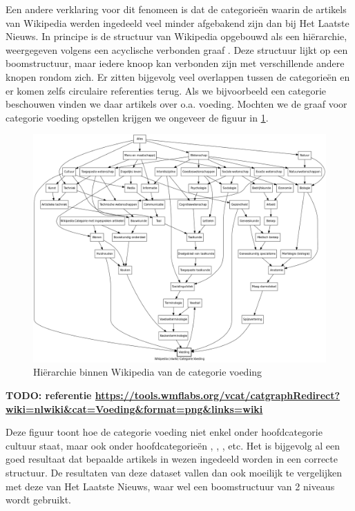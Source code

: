 Een andere verklaring voor dit fenomeen is dat de categorie\"en waarin de artikels van Wikipedia werden ingedeeld veel minder afgebakend zijn dan bij Het Laatste Nieuws. In principe is de structuur van Wikipedia opgebouwd als een hi\"erarchie, weergegeven volgens een acyclische verbonden graaf \cite{Milne2007}. Deze structuur lijkt op een boomstructuur, maar iedere knoop kan verbonden zijn met verschillende andere knopen rondom zich. Er zitten bijgevolg veel overlappen tussen de categorie\"en en er komen zelfs circulaire referenties terug. Als we bijvoorbeeld een categorie  beschouwen vinden we daar artikels over o.a. voeding. Mochten we de graaf voor categorie voeding opstellen krijgen we ongeveer de figuur in \ref{fig:wiki-voeding}.

\begin{figure}[h]
	\caption{Hi\"erarchie binnen Wikipedia van de categorie voeding}
	\label{fig:wiki-voeding}	
	\includegraphics[width=\textwidth]{fig/voeding.png}
\end{figure}

\textbf{TODO: referentie \url{https://tools.wmflabs.org/vcat/catgraphRedirect?wiki=nlwiki&cat=Voeding&format=png&links=wiki}}

Deze figuur toont hoe de categorie voeding niet enkel onder hoofdcategorie cultuur staat, maar ook onder hoofdcategorie\"en , , , etc. Het is bijgevolg al een goed resultaat dat bepaalde artikels in wezen ingedeeld worden in een correcte structuur. De resultaten van deze dataset vallen dan ook moeilijk te vergelijken met deze van Het Laatste Nieuws, waar wel een boomstructuur van 2 niveaus wordt gebruikt.

